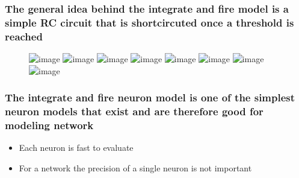 \documentclass{beamer}
\begin{document}
\begin{frame}

\end{frame}



\begin{frame}
\frametitle{The general idea behind the integrate and fire model is a simple RC circuit that is shortcircuted once a threshold is reached}

\begin{figure}
\includegraphics<1>[width = 0.5\textwidth]{rcA.png}
\includegraphics<2>[width = 0.5\textwidth]{rcAI.png}
\includegraphics<3>[width = 0.5\textwidth]{rcARm.png}
\includegraphics<4>[width = 0.5\textwidth]{rcAEm.png}
\includegraphics<5>[width = 0.5\textwidth]{rcACm.png}
\includegraphics<6>[width = 0.5\textwidth]{rcAs.png}
\includegraphics<7>[width = 0.5\textwidth]{rcB.png}
\includegraphics<8>[width = 0.5\textwidth]{rcBs.png}
\end{figure}

\end{frame}



\begin{frame}
\frametitle{The integrate and fire neuron model is one of the simplest neuron models that exist and are therefore good  for modeling network}

\begin{itemize}[<+->]
\item Each neuron is fast to evaluate
\item For a network the precision of a single neuron is not important
\end{itemize}

\end{frame}
\end{document}

